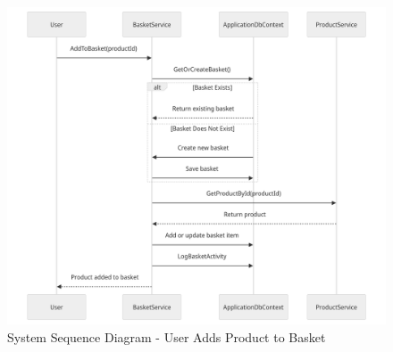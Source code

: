 \begin{figure}
    \centering
    \includegraphics[width=1\textwidth]{figures/diagrams/ssd-user-adds-product-to-basket.png}
    \caption{System Sequence Diagram - User Adds Product to Basket}
    \label{fig:ssd-user-adds-product-to-basket}
\end{figure}